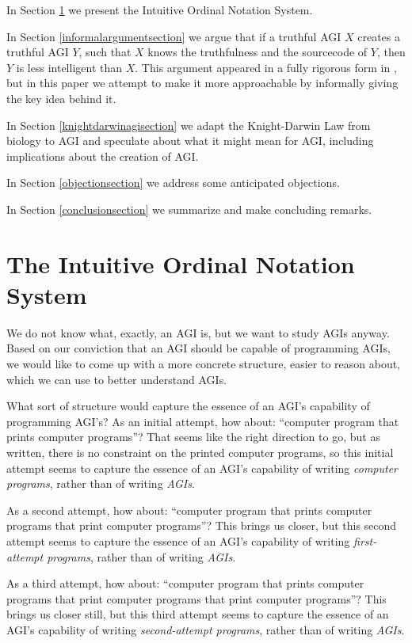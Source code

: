\documentclass[runningheads]{llncs}
\begin{document}
In Section \ref{notationsystemsection} we present the Intuitive Ordinal Notation
System.

In Section \ref{informalargumentsection} we argue that if a truthful AGI $X$ creates
a truthful AGI $Y$, such that $X$
knows the truthfulness and the sourcecode of $Y$, then $Y$ is less intelligent
than $X$. This argument appeared in a fully rigorous form in \cite{alexander2019measuring},
but in this paper we attempt to make it more approachable by informally giving
the key idea behind it.

In Section \ref{knightdarwinagisection} we adapt the Knight-Darwin Law from biology to AGI
and speculate about what it might mean for AGI, including implications about
the creation of AGI.

In Section \ref{objectionsection} we address some anticipated objections.

In Section \ref{conclusionsection} we summarize and make concluding remarks.


\section{The Intuitive Ordinal Notation System}
\label{notationsystemsection}

We do not know what, exactly, an AGI is, but we want to study AGIs anyway.
Based on our conviction that an AGI should be capable of programming AGIs,
we would like to come up with a more concrete structure, easier to reason
about, which we can use to better understand AGIs.

What sort of structure would capture the essence of an AGI's capability
of programming AGI's? As an initial attempt, how about: ``computer
program that prints computer programs''? That seems like the right direction
to go, but as written, there is no constraint on the printed computer programs, so
this initial attempt seems to capture the essence of an
AGI's capability of writing \emph{computer programs}, rather than of writing \emph{AGIs}.

As a second attempt, how
about: ``computer program that prints computer programs that print
computer programs''? This brings us closer, but this second attempt
seems to capture the essence of an AGI's capability of writing \emph{first-attempt programs},
rather than of writing \emph{AGIs}.

As a third attempt, how about:
``computer program that prints computer programs that print computer programs
that print computer programs''? This brings us closer still, but this third
attempt seems to capture the essence of an AGI's capability of writing
\emph{second-attempt programs}, rather than of
writing \emph{AGIs}.
\end{document}
